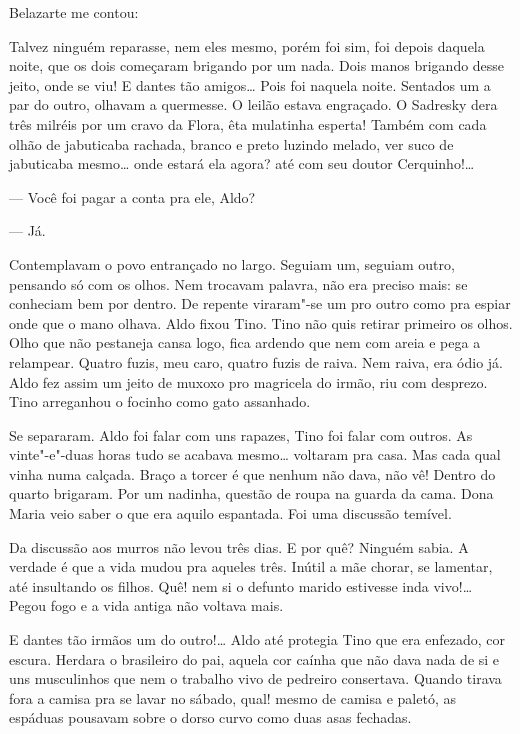 \begin{linenumbers}
Belazarte me contou:

Talvez ninguém reparasse, nem eles mesmo, porém foi sim, foi depois
daquela noite, que os dois começaram brigando por um nada. Dois manos
brigando desse jeito, onde se viu! E dantes tão amigos\ldots{} Pois foi
naquela noite. Sentados um a par do outro, olhavam a quermesse. O leilão
estava engraçado. O Sadresky dera três milréis por um cravo da Flora,
êta mulatinha esperta! Também com cada olhão de jabuticaba rachada,
branco e preto luzindo melado, ver suco de jabuticaba mesmo\ldots{} onde
estará ela agora? até com seu doutor Cerquinho!\ldots{}

--- Você foi pagar a conta pra ele, Aldo?

--- Já.

Contemplavam o povo entrançado no largo. Seguiam um, seguiam outro,
pensando só com os olhos. Nem trocavam palavra, não era preciso mais: se
conheciam bem por dentro. De repente viraram"-se um pro outro como pra
espiar onde que o mano olhava. Aldo fixou Tino. Tino não quis retirar
primeiro os olhos. Olho que não pestaneja cansa logo, fica ardendo que
nem com areia e pega a relampear. Quatro fuzis, meu caro, quatro fuzis
de raiva. Nem raiva, era ódio já. Aldo fez assim um jeito de muxoxo pro
magricela do irmão, riu com desprezo. Tino arreganhou o focinho como
gato assanhado. 

Se separaram. Aldo foi falar com uns rapazes, Tino foi falar com outros.
As vinte"-e"-duas horas tudo se acabava mesmo\ldots{} voltaram pra casa. Mas
cada qual vinha numa calçada. Braço a torcer é que nenhum não dava, não
vê! Dentro do quarto brigaram. Por um nadinha, questão de roupa na
guarda da cama. Dona Maria veio saber o que era aquilo espantada. Foi
uma discussão temível.

Da discussão aos murros não levou três dias. E por quê? Ninguém sabia. A
verdade é que a vida mudou pra aqueles três. Inútil a mãe chorar, se
lamentar, até insultando os filhos. Quê! nem si o defunto marido
estivesse inda vivo!\ldots{} Pegou fogo e a vida antiga não voltava mais.

E dantes tão irmãos um do outro!\ldots{} Aldo até protegia Tino que era
enfezado, cor escura. Herdara o brasileiro do pai, aquela cor caínha que
não dava nada de si e uns musculinhos que nem o trabalho vivo de
pedreiro consertava. Quando tirava fora a camisa pra se lavar no sábado,
qual! mesmo de camisa e paletó, as espáduas pousavam sobre o dorso curvo
como duas asas fechadas.


\end{linenumbers}
